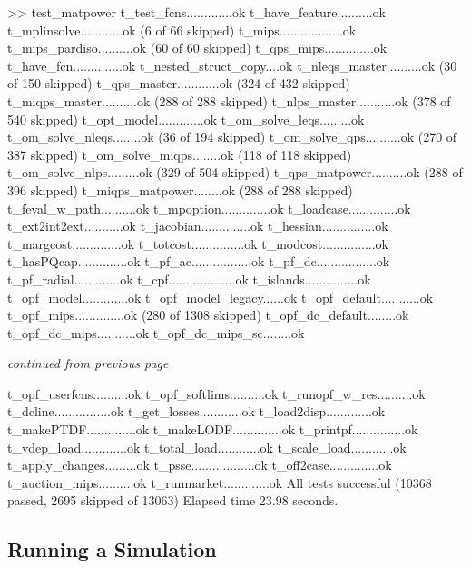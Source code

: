 \documentclass[12pt]{article}
\numberwithin{equation}{section}
\numberwithin{table}{section}
\numberwithin{figure}{section}
\begin{document}
\begin{enumerate}
\begin{Code}
>> test_matpower
t_test_fcns.............ok
t_have_feature..........ok
t_mplinsolve............ok (6 of 66 skipped)
t_mips..................ok
t_mips_pardiso..........ok (60 of 60 skipped)
t_qps_mips..............ok
t_have_fcn..............ok
t_nested_struct_copy....ok
t_nleqs_master..........ok (30 of 150 skipped)
t_qps_master............ok (324 of 432 skipped)
t_miqps_master..........ok (288 of 288 skipped)
t_nlps_master...........ok (378 of 540 skipped)
t_opt_model.............ok
t_om_solve_leqs.........ok
t_om_solve_nleqs........ok (36 of 194 skipped)
t_om_solve_qps..........ok (270 of 387 skipped)
t_om_solve_miqps........ok (118 of 118 skipped)
t_om_solve_nlps.........ok (329 of 504 skipped)
t_qps_matpower..........ok (288 of 396 skipped)
t_miqps_matpower........ok (288 of 288 skipped)
t_feval_w_path..........ok
t_mpoption..............ok
t_loadcase..............ok
t_ext2int2ext...........ok
t_jacobian..............ok
t_hessian...............ok
t_margcost..............ok
t_totcost...............ok
t_modcost...............ok
t_hasPQcap..............ok
t_pf_ac.................ok
t_pf_dc.................ok
t_pf_radial.............ok
t_cpf...................ok
t_islands...............ok
t_opf_model.............ok
t_opf_model_legacy......ok
t_opf_default...........ok
t_opf_mips..............ok (280 of 1308 skipped)
t_opf_dc_default........ok
t_opf_dc_mips...........ok
t_opf_dc_mips_sc........ok
\end{Code}
\emph{continued from previous page}
\begin{Code}
t_opf_userfcns..........ok
t_opf_softlims..........ok
t_runopf_w_res..........ok
t_dcline................ok
t_get_losses............ok
t_load2disp.............ok
t_makePTDF..............ok
t_makeLODF..............ok
t_printpf...............ok
t_vdep_load.............ok
t_total_load............ok
t_scale_load............ok
t_apply_changes.........ok
t_psse..................ok
t_off2case..............ok
t_auction_mips..........ok
t_runmarket.............ok
All tests successful (10368 passed, 2695 skipped of 13063)
Elapsed time 23.98 seconds.
\end{Code}
\end{enumerate}

\subsection{Running a Simulation}
\label{sec:runsimulation}
\end{document}
